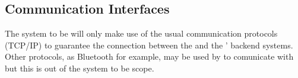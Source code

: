 \documentclass[../../../rasd.tex]{subfiles}
\begin{document}
\subsection{Communication Interfaces}
The system to be will only make use of the usual communication protocols (TCP/IP) to guarantee the connection between the  and the ' backend systems.
\\ Other protocols, as Bluetooth for example, may be used by  to comunicate with  but this is out of the system to be scope.
\end{document}
